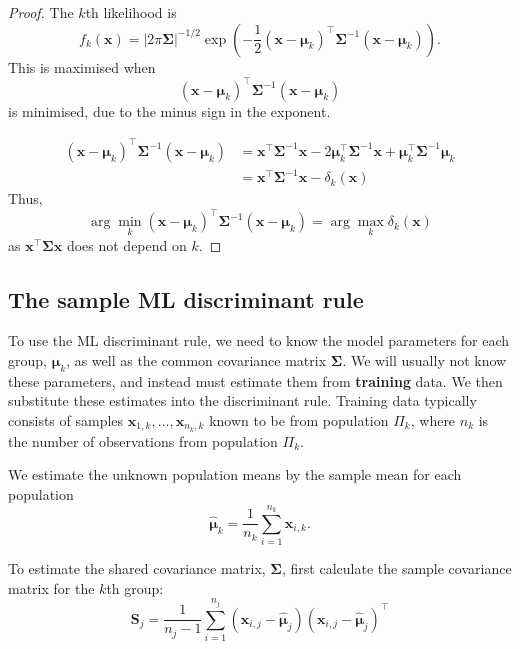 \documentclass[
]{book}
\theoremstyle{definition}
\theoremstyle{definition}
\theoremstyle{definition}
\theoremstyle{definition}
\theoremstyle{remark}
\begin{document}
\begin{proof}
The \(k\)th likelihood is
\begin{equation}
f_k(\mathbf x) = | 2 \pi \boldsymbol{\Sigma}|^{-1/2} \exp \left(-\frac{1}{2} (\mathbf x- {\boldsymbol{\mu}}_k)^\top \boldsymbol{\Sigma}^{-1} (\mathbf x- {\boldsymbol{\mu}}_k) \right).\label{eq:mvnlike}
\end{equation}
This is maximised when \[(\mathbf x- {\boldsymbol{\mu}}_k)^\top \boldsymbol{\Sigma}^{-1} (\mathbf x- {\boldsymbol{\mu}}_k)\] is minimised, due to the minus sign in the exponent.

\begin{align*}
(\mathbf x-{\boldsymbol{\mu}}_k)^\top \boldsymbol{\Sigma}^{-1} (\mathbf x-{\boldsymbol{\mu}}_k) &= \mathbf x^\top \boldsymbol{\Sigma}^{-1}\mathbf x
-2{\boldsymbol{\mu}}_k^\top \boldsymbol{\Sigma}^{-1}\mathbf x+{\boldsymbol{\mu}}_k^\top \boldsymbol{\Sigma}^{-1}{\boldsymbol{\mu}}_k\\
&= \mathbf x^\top \boldsymbol{\Sigma}^{-1}\mathbf x-\delta_k(\mathbf x)
\end{align*}
Thus,
\[\arg \min_k (\mathbf x-{\boldsymbol{\mu}}_k)^\top \boldsymbol{\Sigma}^{-1} (\mathbf x-{\boldsymbol{\mu}}_k) = \arg\max_k \delta_k(\mathbf x)\]
as \(\mathbf x^\top \boldsymbol{\Sigma}\mathbf x\) does not depend on \(k\).
\end{proof}

\hypertarget{sample-lda}{%
\subsection{The sample ML discriminant rule}\label{sample-lda}}

To use the ML discriminant rule, we need to know the model parameters for each group, \({\boldsymbol{\mu}}_k\), as well as the common covariance matrix \(\boldsymbol{\Sigma}\). We will usually not know these parameters, and instead must estimate them from \textbf{training} data. We then substitute these estimates into the discriminant rule. Training data typically consists of samples \(\mathbf x_{1,k}, \ldots, \mathbf x_{n_k,k}\) known to be from population \(\Pi_k\), where \(n_k\) is the number of observations from population \(\Pi_k\).

We estimate the unknown population means by the sample mean for each population
\[\hat{{\boldsymbol{\mu}}}_k =\frac{1}{n_k} \sum_{i=1}^{n_k} \mathbf x_{i,k}.\]

To estimate the shared covariance matrix, \(\boldsymbol{\Sigma}\), first calculate the sample covariance matrix for the \(k\)th group:
\[\mathbf S_j=\frac{1}{n_j-1}\sum_{i=1}^{n_j} (\mathbf x_{i,j}-\hat{{\boldsymbol{\mu}}}_j)(\mathbf x_{i,j}-\hat{{\boldsymbol{\mu}}}_j)^\top\]
\end{document}
